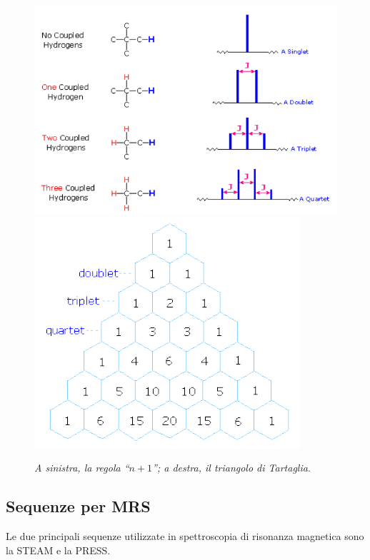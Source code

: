 \documentclass{report}
\newcommand{\virgolette}[1]{``#1''}
\numberwithin{equation}{section}
\numberwithin{figure}{section}
\begin{document}
\begin{figure}[htp]
\centering
\includegraphics[scale=0.75]{immagini/picchi.png}\quad\includegraphics[scale=0.8]{immagini/tartaglia.png}
\caption{\label{fig:picchi} \textit{A sinistra, la regola \virgolette{$n+1$}; a destra, il triangolo di Tartaglia}.}
\end{figure}

\subsection{Sequenze per MRS}
Le due principali sequenze utilizzate in spettroscopia di risonanza magnetica sono la STEAM e la PRESS.
\end{document}
